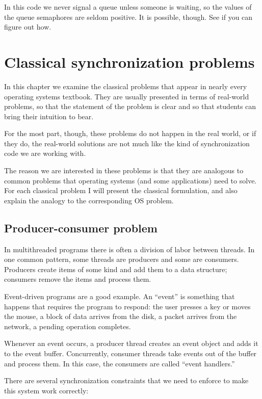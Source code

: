 \documentclass{book}
\begin{document}
In this code we never signal a queue unless someone is waiting,
so the values of the queue semaphores are seldom positive.
It is possible, though.  See if you can figure out how.



\chapter{Classical synchronization problems}

In this chapter we examine the classical problems that appear
in nearly every operating systems textbook.  They
are usually presented in terms of real-world problems, so
that the statement of the problem is clear and so that students
can bring their intuition to bear.

For the most part, though, these problems do not happen in the
real world, or if they do, the real-world solutions are not much
like the kind of synchronization code we are working with.

The reason we are interested in these problems
is that they are analogous to common problems that operating
systems (and some applications) need to solve.  For each classical
problem I will present the classical formulation, and also explain
the analogy to the corresponding OS problem.


\section{Producer-consumer problem}

In multithreaded programs there is often a division of labor between
threads.  In one common pattern, some threads are producers and some
are consumers.  Producers create items of some kind and add them to a
data structure; consumers remove the items and process them.

Event-driven programs are a good example.  An ``event'' is something
that happens that requires the program to respond: the user presses a
key or moves the mouse, a block of data arrives from the disk, a
packet arrives from the network, a pending operation completes.

Whenever an event occurs, a producer thread creates an event
object and adds it to the event buffer.  Concurrently, consumer
threads take events out of the buffer and process them.
In this case, the consumers are called ``event handlers.''

There are several synchronization constraints that we need to
enforce to make this system work correctly:
\end{document}
